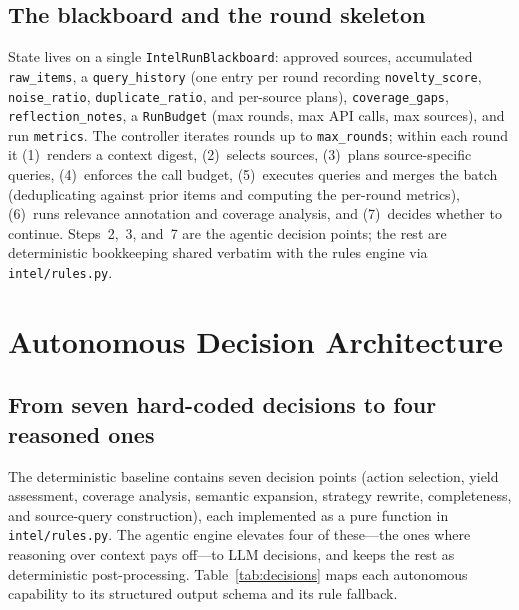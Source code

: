\documentclass[conference]{IEEEtran}
\newcommand{\code}[1]{\texttt{\small #1}}
\begin{document}
\subsection{The blackboard and the round skeleton}

State lives on a single \code{IntelRunBlackboard}: approved sources, accumulated \code{raw\_items}, a \code{query\_history} (one entry per round recording \code{novelty\_score}, \code{noise\_ratio}, \code{duplicate\_ratio}, and per-source plans), \code{coverage\_gaps}, \code{reflection\_notes}, a \code{RunBudget} (max rounds, max API calls, max sources), and run \code{metrics}. The controller iterates rounds up to \code{max\_rounds}; within each round it (1)~renders a context digest, (2)~selects sources, (3)~plans source-specific queries, (4)~enforces the call budget, (5)~executes queries and merges the batch (deduplicating against prior items and computing the per-round metrics), (6)~runs relevance annotation and coverage analysis, and (7)~decides whether to continue. Steps~2,~3, and~7 are the agentic decision points; the rest are deterministic bookkeeping shared verbatim with the rules engine via \code{intel/rules.py}.

\section{Autonomous Decision Architecture}
\label{sec:decisions}

\subsection{From seven hard-coded decisions to four reasoned ones}

The deterministic baseline contains seven decision points (action selection, yield assessment, coverage analysis, semantic expansion, strategy rewrite, completeness, and source-query construction), each implemented as a pure function in \code{intel/rules.py}. The agentic engine elevates four of these---the ones where reasoning over context pays off---to LLM decisions, and keeps the rest as deterministic post-processing. Table~\ref{tab:decisions} maps each autonomous capability to its structured output schema and its rule fallback.
\end{document}
